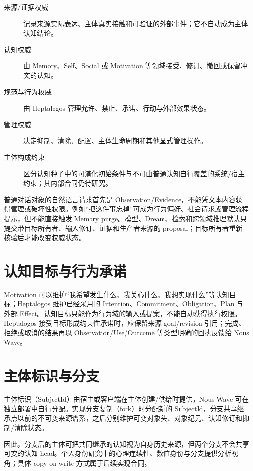 \begin{description}
\item[来源/证据权威] 记录来源实际表达、主体真实接触和可验证的外部事件；它不自动成为主体认知结论。
\item[认知权威] 由 Memory、Self、Social 或 Motivation 等领域接受、修订、撤回或保留冲突的认知。
\item[规范与行为权威] 由 Heptalogos 管理允许、禁止、承诺、行动与外部效果状态。
\item[管理权威] 决定抑制、清除、配置、主体生命周期和其他显式管理操作。
\item[主体构成约束] 区分认知种子中的可演化初始条件与不可由普通认知自行覆盖的系统/宿主约束；其内部合同仍待研究。
\end{description}

普通对话对象的自然语言请求首先是 Observation/Evidence，不能凭文本内容获得管理或破坏性权限。例如“把这件事忘掉”可成为行为偏好、社会请求或管理流程提示，但不能直接触发 Memory purge。模型、Dream、检索和跨领域推理默认只提交带目标所有者、输入修订、证据和生产者来源的 proposal；目标所有者重新核验后才能改变权威状态。

\section{认知目标与行为承诺}

Motivation 可以维护“我希望发生什么、我关心什么、我想实现什么”等认知目标；Heptalogos 维护已经采用的 Intention、Commitment、Obligation、Plan 与外部 Effect。认知目标只能作为行为域的输入或提案，不能自动获得执行权限。Heptalogos 接受目标形成约束性承诺时，应保留来源 goal/revision 引用；完成、拒绝或取消的结果再以 Observation/Use/Outcome 等类型明确的回执反馈给 Nous Wave。

\section{主体标识与分支}

主体标识（SubjectId）由宿主或客户端在主体创建/供给时提供，Nous Wave 可在独立部署中自行分配。实现分支复制（fork）时分配新的 SubjectId，分支共享继承点以前的不可变来源谱系，之后分别维护可变对象头、对象纪元、认知修订和抑制/清除状态。\cite{nous-research-package,olson2023}

因此，分支后的主体可把共同继承的认知视为自身历史来源，但两个分支不会共享可变的认知 head。个人身份研究中的心理连续性、数值身份与分支提供分析视角；具体 copy-on-write 方式属于后续实现合同。